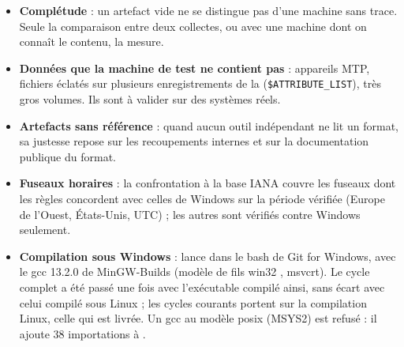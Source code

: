 \documentclass[11pt,a4paper,oneside]{report}
\begin{document}
\begin{itemize}
  \item \textbf{Complétude} : un artefact vide ne se distingue pas d'une
    machine sans trace. Seule la comparaison entre deux collectes, ou avec une
    machine dont on connaît le contenu, la mesure.
  \item \textbf{Données que la machine de test ne contient pas} :
    appareils MTP, fichiers éclatés sur plusieurs enregistrements de la
     (\texttt{\$ATTRIBUTE\_LIST}), très gros volumes. Ils sont à
    valider sur des systèmes réels.
  \item \textbf{Artefacts sans référence} : quand aucun outil indépendant ne
    lit un format, sa justesse repose sur les recoupements internes et sur la
    documentation publique du format.
  \item \textbf{Fuseaux horaires} : la confrontation à la base IANA couvre les
    fuseaux dont les règles concordent avec celles de Windows sur la période
    vérifiée (Europe de l'Ouest, États-Unis, UTC) ; les autres sont vérifiés
    contre Windows seulement.
  \item \textbf{Compilation sous Windows} :  lance
     dans le bash de Git for Windows, avec le gcc
    13.2.0 de MinGW-Builds (modèle de fils \og win32 \fg{}, msvcrt). Le cycle
    complet a été passé une fois avec l'exécutable compilé ainsi, sans écart
    avec celui compilé sous Linux ; les cycles courants portent sur la
    compilation Linux, celle qui est livrée. Un gcc au modèle \og posix \fg{}
    (MSYS2) est refusé : il ajoute 38 importations à .
\end{itemize}
\end{document}
